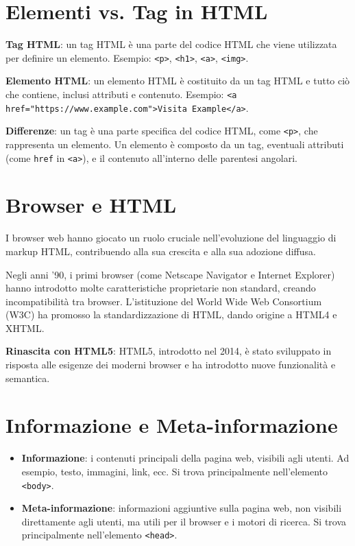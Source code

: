 \section{Elementi vs. Tag in HTML}

\textbf{Tag HTML}: un tag HTML è una parte del codice HTML che viene utilizzata per definire un elemento. Esempio: \texttt{<p>}, \texttt{<h1>}, \texttt{<a>}, \texttt{<img>}.

\textbf{Elemento HTML}: un elemento HTML è costituito da un tag HTML e tutto ciò che contiene, inclusi attributi e contenuto. Esempio: \texttt{<a href="https://www.example.com">Visita Example</a>}.

\textbf{Differenze}: un tag è una parte specifica del codice HTML, come \texttt{<p>}, che rappresenta un elemento. Un elemento è composto da un tag, eventuali attributi (come \texttt{href} in \texttt{<a>}), e il contenuto all'interno delle parentesi angolari.

\section{Browser e HTML}

I browser web hanno giocato un ruolo cruciale nell'evoluzione del linguaggio di markup HTML, contribuendo alla sua crescita e alla sua adozione diffusa.

Negli anni '90, i primi browser (come Netscape Navigator e Internet Explorer) hanno introdotto molte caratteristiche proprietarie non standard, creando incompatibilità tra browser. L'istituzione del World Wide Web Consortium (W3C) ha promosso la standardizzazione di HTML, dando origine a HTML4 e XHTML.

\textbf{Rinascita con HTML5}: HTML5, introdotto nel 2014, è stato sviluppato in risposta alle esigenze dei moderni browser e ha introdotto nuove funzionalità e semantica.

\section{Informazione e Meta-informazione}

\begin{itemize}
    \item \textbf{Informazione}: i contenuti principali della pagina web, visibili agli utenti. Ad esempio, testo, immagini, link, ecc. Si trova principalmente nell'elemento \texttt{<body>}.
    \item \textbf{Meta-informazione}: informazioni aggiuntive sulla pagina web, non visibili direttamente agli utenti, ma utili per il browser e i motori di ricerca. Si trova principalmente nell'elemento \texttt{<head>}.
\end{itemize}

